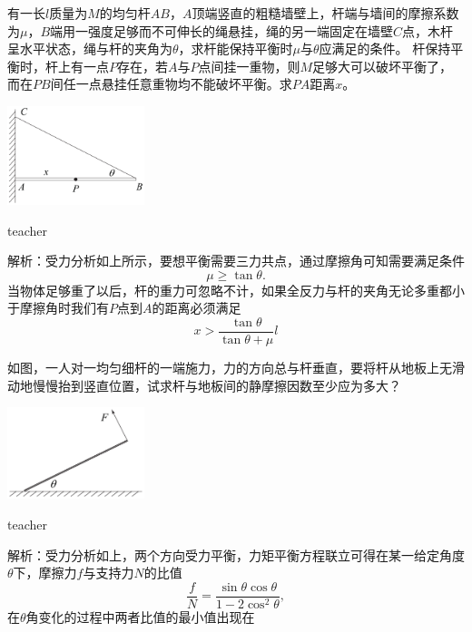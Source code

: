 \begin{example}
有一长$l$质量为$M$的均匀杆$AB$，$A$顶端竖直的粗糙墙壁上，杆端与墙间的摩擦系数为$\mu$，$B$端用一强度足够而不可伸长的绳悬挂，绳的另一端固定在墙壁$C$点，木杆呈水平状态，绳与杆的夹角为$\theta$，求杆能保持平衡时$\mu$与$\theta$应满足的条件。
杆保持平衡时，杆上有一点$P$存在，若$A$与$P$点间挂一重物，则$M$足够大可以破坏平衡了，而在$PB$间任一点悬挂任意重物均不能破坏平衡。求$PA$距离$x$。

\begin{flushright}
\includegraphics[width = 0.3\textwidth]{images/static-force-16.pdf} 
\end{flushright}

\begin{taggedblock}{teacher}
\vspace*{2cm}

\noindent
解析：受力分析如上所示，要想平衡需要三力共点，通过摩擦角可知需要满足条件
\[
\mu\ge \tan\theta.
\]
当物体足够重了以后，杆的重力可忽略不计，如果全反力与杆的夹角无论多重都小于摩擦角时我们有$P$点到$A$的距离必须满足
\[
x>\frac{\tan\theta}{\tan\theta +\mu}l
\]
\end{taggedblock}
\end{example}


\begin{example}

如图，一人对一均匀细杆的一端施力，力的方向总与杆垂直，要将杆从地板上无滑动地慢慢抬到竖直位置，试求杆与地板间的静摩擦因数至少应为多大？
\begin{flushright}
\includegraphics[width = 0.3\textwidth]{images/static-force-21.pdf} 
\end{flushright}
\begin{taggedblock}{teacher}

\vspace*{3cm}

\noindent
解析：受力分析如上，两个方向受力平衡，力矩平衡方程联立可得在某一给定角度$\theta$下，摩擦力$f$与支持力$N$的比值
\[
\frac{f}{N} = \frac{\sin\theta\cos\theta}{1-2\cos^2\theta},
\]
在$\theta$角变化的过程中两者比值的最小值出现在
\end{taggedblock}
\end{example}


